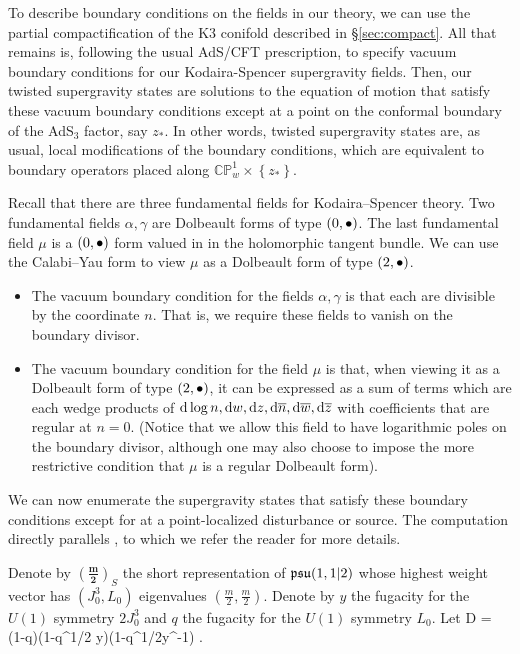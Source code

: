 \documentclass[../main.tex]{subfiles}
\begin{document}
To describe boundary conditions on the fields in our theory, we can use the partial compactification of the K3 conifold described in \S \ref{sec:compact}. All that remains is, following the usual AdS/CFT prescription, to specify vacuum boundary conditions for our Kodaira-Spencer supergravity fields. Then, our twisted supergravity states are solutions to the equation of motion that satisfy these vacuum boundary conditions except at a point on the conformal boundary of the AdS$_3$ factor, say $z_*$. In other words, twisted supergravity states are, as usual, local modifications of the boundary conditions, which are equivalent to boundary operators placed along  $\mathbb{CP}^1_w \times \left\lbrace z_* \right\rbrace$. 

Recall that there are three fundamental fields for Kodaira--Spencer theory.
Two fundamental fields $\alpha, \gamma$ are Dolbeault forms of type $(0,{\bullet})$.
The last fundamental field $\mu$ is a $(0,{\bullet})$ form valued in in the holomorphic tangent bundle.
We can use the Calabi--Yau form to view $\mu$ as a Dolbeault form of type $(2,{\bullet})$.

\begin{itemize}
\item The vacuum boundary condition for the fields $\alpha, \gamma$ is that each are divisible by the coordinate $n$. That is, we require these fields to vanish on the boundary divisor.
\item The vacuum boundary condition for the field $\mu$ is that, when viewing it as a Dolbeault form of type $(2,{\bullet})$, it can be expressed as a sum of terms which are each wedge products of $\mathrm{d} \log n, \mathrm{d} w, \mathrm{d} z , \mathrm{d} \overline n, \mathrm{d} \overline w , \mathrm{d} \overline z$ with coefficients that are regular at $n = 0$. (Notice that we allow this field to have logarithmic poles on the boundary divisor, although one may also choose to impose the more restrictive condition that $\mu$ is a regular Dolbeault form). 
\end{itemize} 

We can now enumerate the supergravity states that satisfy these boundary conditions except for at a point-localized disturbance or source. The computation directly parallels \cite{CostelloGaiotto, CP}, to which we refer the reader for more details. 

Denote by $\left(\mathbf{\frac{m}{2}}\right)_S$ the short representation of $\mathfrak{psu}(1,1|2)$ whose highest weight vector has $(J_0^3,L_0)$ eigenvalues $(\frac{m}{2}, \frac{m}{2})$. 
Denote by $y$ the fugacity for the $U(1)$ symmetry $2J_0^3$ and $q$ the fugacity for the $U(1)$ symmetry $L_0$.
Let 
\beqn
D = (1-q)(1-q^{1/2} y)(1-q^{1/2}y^{-1}) .
\eeqn
\end{document}
